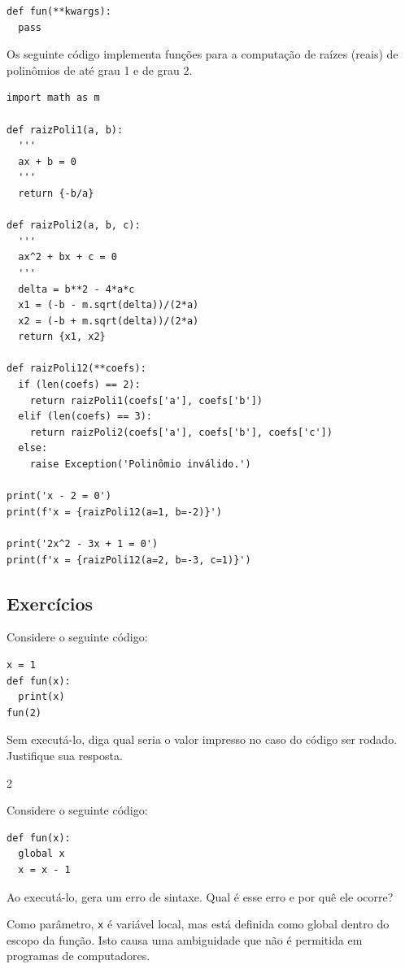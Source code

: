 \begin{lstlisting}
def fun(**kwargs):
  pass
\end{lstlisting}


\begin{ex}
  Os seguinte código implementa funções para a computação de raízes (reais) de polinômios de até grau 1 e de grau 2.

\begin{lstlisting}
import math as m

def raizPoli1(a, b):
  '''
  ax + b = 0
  '''
  return {-b/a}

def raizPoli2(a, b, c):
  '''
  ax^2 + bx + c = 0
  '''
  delta = b**2 - 4*a*c
  x1 = (-b - m.sqrt(delta))/(2*a)
  x2 = (-b + m.sqrt(delta))/(2*a)
  return {x1, x2}

def raizPoli12(**coefs):
  if (len(coefs) == 2):
    return raizPoli1(coefs['a'], coefs['b'])
  elif (len(coefs) == 3):
    return raizPoli2(coefs['a'], coefs['b'], coefs['c'])
  else:
    raise Exception('Polinômio inválido.')

print('x - 2 = 0')
print(f'x = {raizPoli12(a=1, b=-2)}')

print('2x^2 - 3x + 1 = 0')
print(f'x = {raizPoli12(a=2, b=-3, c=1)}')
\end{lstlisting}

\end{ex}

\subsection{Exercícios}

\begin{exer}
  Considere o seguinte código:

\begin{lstlisting}
x = 1
def fun(x):
  print(x)
fun(2)
\end{lstlisting}
  
Sem executá-lo, diga qual seria o valor impresso no caso do código ser rodado. Justifique sua resposta.
\end{exer}
\begin{resp}
  2
\end{resp}

\begin{exer}
  Considere o seguinte código:

\begin{lstlisting}
def fun(x):
  global x
  x = x - 1
\end{lstlisting}
  
Ao executá-lo, {\python} gera um erro de sintaxe. Qual é esse erro e por quê ele ocorre?
\end{exer}
\begin{resp}
  Como parâmetro, \lstinline+x+ é variável local, mas está definida como global dentro do escopo da função. Isto causa uma ambiguidade que não é permitida em programas de computadores.
\end{resp}


